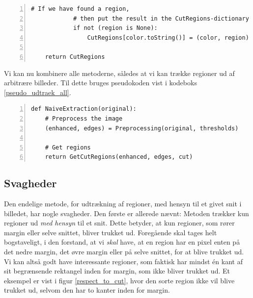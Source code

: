{\begin{lstlisting}[caption={Pseudokode til udtrækning af regioner med
    margin.},captionpos=b,label={pseudo_udtraek_margin},numbers=left,
    frame=tb, breaklines=false, float=h]
            # If we have found a region,
            # then put the result in the CutRegions-dictionary
            if not (region is None):
                CutRegions[color.toString()] = (color, region)

    return CutRegions
\end{lstlisting}

Vi kan nu kombinere alle metoderne, således at vi kan trække regioner ud
af arbitrære billeder. Til dette bruges pseudokoden vist i kodeboks
\ref{pseudo_udtraek_all}.

\begin{lstlisting}[caption={Fuld udtrækning af regioner i et arbitært
    billede.},captionpos=b,label={pseudo_udtraek_all},numbers=left,
    frame=tb, breaklines=false, float=h]
def NaiveExtraction(original):
    # Preprocess the image
    (enhanced, edges) = Preprocessing(original, thresholds)

    # Get regions
    return GetCutRegions(enhanced, edges, cut)
\end{lstlisting}

\subsection{Svagheder\label{subsec_svagheder}}
Den endelige metode, for udtrækning af regioner, med hensyn til et givet
snit i billedet, har nogle svagheder. Den første er allerede nævnt:
Metoden trækker kun regioner ud \emph{med hensyn} til et snit. Dette
betyder, at kun regioner, som rører margin eller selve snittet, bliver
trukket ud. Foregående skal tages helt bogstaveligt, i den forstand, at
vi \emph{skal} have, at en region har en pixel enten på det nedre
margin, det øvre margin eller på selve snittet, for at blive trukket ud.
Vi kan altså godt have interessante regioner, som faktisk har mindst én
kant af sit begrænsende rektangel inden for margin, som ikke bliver
trukket ud. Et eksempel er vist i figur \ref{respect_to_cut}, hvor den
sorte region ikke vil blive trukket ud, selvom den har to kanter inden
for margin.

}
